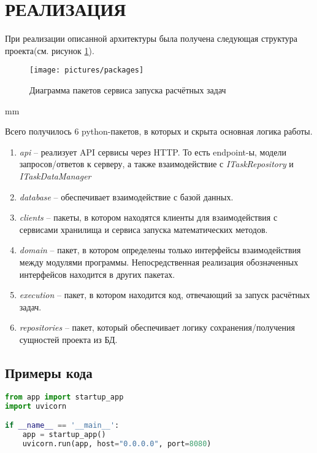 \section*{\Large{РЕАЛИЗАЦИЯ}}

При реализации описанной архитектуры была получена следующая структура
проекта(см. рисунок \ref{pic:implementation__packages}).

\begin{figure}[H]
	\texttt{[image: pictures/packages]}
	\caption{Диаграмма пакетов сервиса запуска расчётных задач}
	\label{pic:implementation__packages}
\end{figure}
 mm

Всего получилось 6 python-пакетов, в которых и скрыта основная логика работы.
\begin{enumerate}
    \item \textit{api} -- реализует API сервисы через HTTP. То есть endpoint-ы,
    модели запросов/ответов к серверу, а также взаимодействие с \textit{ITaskRepository} и \textit{ITaskDataManager}
    \item \textit{database} -- обеспечивает взаимодействие с базой данных.
    \item \textit{clients} -- пакеты, в котором находятся клиенты для взаимодействия с сервисами хранилища и сервиса 
    запуска математических методов.
    \item \textit{domain} -- пакет, в котором определены только интерфейсы взаимодействия между модулями программы.
    Непосредственная реализация обозначенных интерфейсов находится в других пакетах.
    \item \textit{execution} -- пакет, в котором находится код, отвечающий за запуск расчётных задач.
    \item \textit{repositories} -- пакет, который обеспечивает логику сохранения/получения сущностей проекта из БД.
\end{enumerate}

\subsection*{\Large{Примеры кода}}

\begin{lstlisting}[language=Python, caption=main.py, captionpos=b]
from app import startup_app
import uvicorn

if __name__ == '__main__':
    app = startup_app()
    uvicorn.run(app, host="0.0.0.0", port=8080)
\end{lstlisting}

